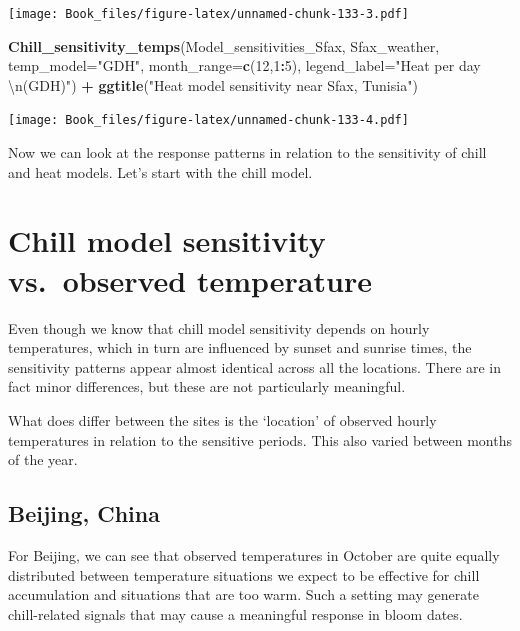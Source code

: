 \documentclass[
]{book}
\newenvironment{Shaded}{\begin{snugshade}}{\end{snugshade}}
\newcommand{\CharTok}[1]{\textcolor[rgb]{0.31,0.60,0.02}{#1}}
\newcommand{\DataTypeTok}[1]{\textcolor[rgb]{0.13,0.29,0.53}{#1}}
\newcommand{\DecValTok}[1]{\textcolor[rgb]{0.00,0.00,0.81}{#1}}
\newcommand{\KeywordTok}[1]{\textcolor[rgb]{0.13,0.29,0.53}{\textbf{#1}}}
\newcommand{\NormalTok}[1]{#1}
\newcommand{\OperatorTok}[1]{\textcolor[rgb]{0.81,0.36,0.00}{\textbf{#1}}}
\newcommand{\StringTok}[1]{\textcolor[rgb]{0.31,0.60,0.02}{#1}}
\begin{document}
\texttt{[image: Book\_files/figure-latex/unnamed-chunk-133-3.pdf]}

\begin{Shaded}
\begin{Highlighting}[]
\KeywordTok{Chill_sensitivity_temps}\NormalTok{(Model_sensitivities_Sfax,}
\NormalTok{                        Sfax_weather,}
                        \DataTypeTok{temp_model=}\StringTok{"GDH"}\NormalTok{,}
                        \DataTypeTok{month_range=}\KeywordTok{c}\NormalTok{(}\DecValTok{12}\NormalTok{,}\DecValTok{1}\OperatorTok{:}\DecValTok{5}\NormalTok{),}
                        \DataTypeTok{legend_label=}\StringTok{"Heat per day }\CharTok{\textbackslash{}n}\StringTok{(GDH)"}\NormalTok{) }\OperatorTok{+}
\StringTok{  }\KeywordTok{ggtitle}\NormalTok{(}\StringTok{"Heat model sensitivity near Sfax, Tunisia"}\NormalTok{)}
\end{Highlighting}
\end{Shaded}

\texttt{[image: Book\_files/figure-latex/unnamed-chunk-133-4.pdf]}

Now we can look at the response patterns in relation to the sensitivity of chill and heat models. Let's start with the chill model.

\hypertarget{chill-model-sensitivity-vs.-observed-temperature}{%
\section{Chill model sensitivity vs.~observed temperature}\label{chill-model-sensitivity-vs.-observed-temperature}}

Even though we know that chill model sensitivity depends on hourly temperatures, which in turn are influenced by sunset and sunrise times, the sensitivity patterns appear almost identical across all the locations. There are in fact minor differences, but these are not particularly meaningful.

What does differ between the sites is the `location' of observed hourly temperatures in relation to the sensitive periods. This also varied between months of the year.

\hypertarget{beijing-china}{%
\subsection{Beijing, China}\label{beijing-china}}

For Beijing, we can see that observed temperatures in October are quite equally distributed between temperature situations we expect to be effective for chill accumulation and situations that are too warm. Such a setting may generate chill-related signals that may cause a meaningful response in bloom dates.
\end{document}
